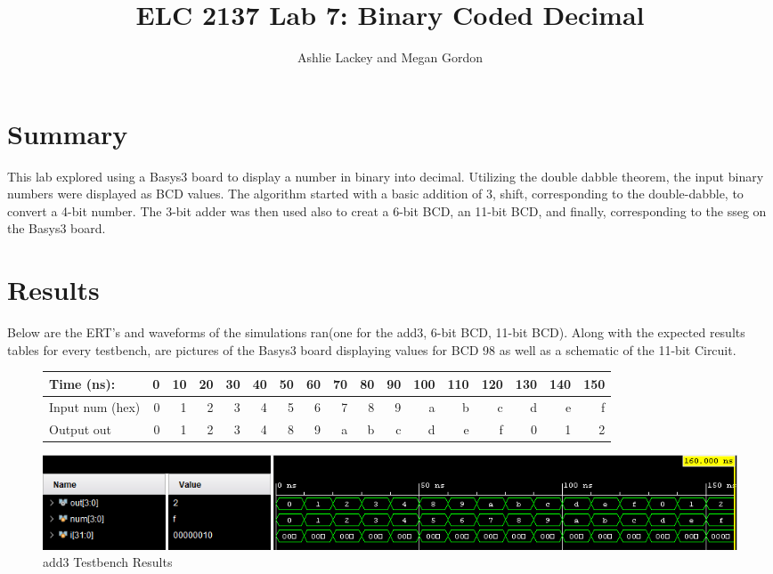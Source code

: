 \documentclass[11pt]{article}
\begin{document}
\title{ELC 2137 Lab 7: Binary Coded Decimal}
\author{Ashlie Lackey and Megan Gordon}

\maketitle


\section*{Summary}
This lab explored using a Basys3 board to display a number in binary into decimal. Utilizing the double dabble theorem, the input binary numbers were displayed as BCD values. The algorithm started with a basic addition of 3, shift, corresponding to the double-dabble, to convert a 4-bit number. The 3-bit adder was then used also to creat a 6-bit BCD, an 11-bit BCD, and finally, corresponding to the sseg on the Basys3 board. 


\section*{Results}
Below are the ERT's and waveforms of the simulations ran(one for the add3, 6-bit BCD, 11-bit BCD). Along with the expected results tables for every testbench, are pictures of the Basys3 board displaying values for BCD 98 as well as a schematic of the 11-bit Circuit. 


\begin{figure}[ht]\centering
	\begin{tabular}{l|rrrrrrrrrrrrrrrr}
		Time (ns): & 0 & 10 & 20 & 30 & 40 & 50 & 60 & 70 & 80 & 90 & 100 & 110 & 120 & 130 & 140 & 150 \\
		\midrule
		Input num (hex) & 0 & 1 & 2 & 3 & 4 & 5 & 6 & 7 & 8 & 9 & a & b & c & d & e & f \\
		\midrule
		Output out & 0 & 1 & 2 & 3 & 4 & 8 & 9 & a & b & c & d & e & f & 0 & 1 & 2 \\
		\bottomrule
	\end{tabular}\medskip

 \includegraphics[width=1.1\textwidth]{add3_test.png}
 \caption{add3 Testbench Results}
 \label{fig:sim_with_table}
\end{figure}
\clearpage
\end{document}

